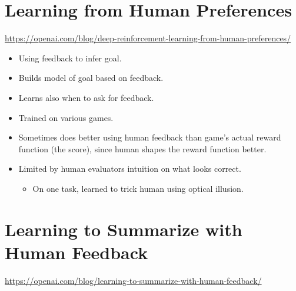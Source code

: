 \section{Learning from Human Preferences}

\url{https://openai.com/blog/deep-reinforcement-learning-from-human-preferences/}

\begin{itemize}
    \item Using feedback to infer goal.
    \item Builds model of goal based on feedback.
    \item Learns also when to ask for feedback.
    \item Trained on various games.
    \item Sometimes does better using human feedback than game's actual reward function (the score), since human shapes the reward function better.
    \item Limited by human evaluators intuition on what looks correct.
    \begin{itemize}
        \item On one task, learned to trick human using optical illusion.
    \end{itemize}
\end{itemize}


\section{Learning to Summarize with Human Feedback}

\url{https://openai.com/blog/learning-to-summarize-with-human-feedback/}

